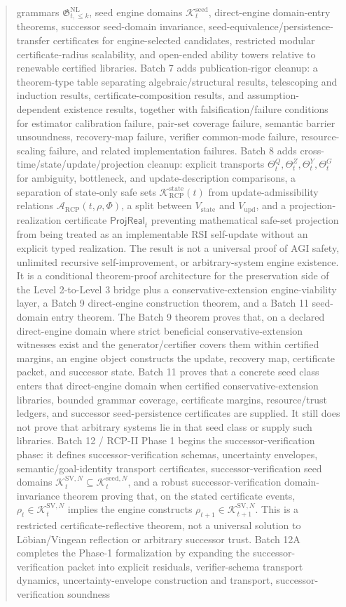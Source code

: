 \documentclass[11pt]{article}
\newcommand{\K}{\mathcal{K}}
\newcommand{\Acal}{\mathcal{A}}
\newcommand{\1}{\mathbf{1}}
\newcommand{\RCP}{\mathrm{RCP}}
\newcommand{\state}{\mathrm{state}}
\providecommand{\Kcal}{\mathcal{K}}
\providecommand{\upd}{\mathrm{upd}}
\begin{document}
\begin{abstract}
grammars \(\mathfrak G_{t,\le k}^{\mathrm{NL}}\), seed engine domains \(\Kcal_t^{\mathrm{seed}}\), direct-engine domain-entry theorems, successor seed-domain invariance, seed-equivalence/persistence-transfer certificates for engine-selected candidates, restricted modular certificate-radius scalability, and open-ended ability towers relative to renewable certified libraries. Batch 7 adds publication-rigor cleanup: a theorem-type table separating algebraic/structural results, telescoping and induction results, certificate-composition results, and assumption-dependent existence results, together with falsification/failure conditions for estimator calibration failure, pair-set coverage failure, semantic barrier unsoundness, recovery-map failure, verifier common-mode failure, resource-scaling failure, and related implementation failures. Batch 8 adds cross-time/state/update/projection cleanup: explicit transports \(\Theta_t^Q,\Theta_t^Z,\Theta_t^Y,\Theta_t^G\) for ambiguity, bottleneck, and update-description comparisons, a separation of state-only safe sets \(\K_{\RCP}^{\state}(t)\) from update-admissibility relations \(\Acal_{\RCP}(t,\rho,\Phi)\), a split between \(V_{\state}\) and \(V_{\upd}\), and a projection-realization certificate \(\mathsf{ProjReal}_t\) preventing mathematical safe-set projection from being treated as an implementable RSI self-update without an explicit typed realization. The result is not a universal proof of AGI safety, unlimited recursive self-improvement, or arbitrary-system engine existence. It is a conditional theorem-proof architecture for the preservation side of the Level 2-to-Level 3 bridge plus a conservative-extension engine-viability layer, a Batch 9 direct-engine construction theorem, and a Batch 11 seed-domain entry theorem. The Batch 9 theorem proves that, on a declared direct-engine domain where strict beneficial conservative-extension witnesses exist and the generator/certifier covers them within certified margins, an engine object constructs the update, recovery map, certificate packet, and successor state. Batch 11 proves that a concrete seed class enters that direct-engine domain when certified conservative-extension libraries, bounded grammar coverage, certificate margins, resource/trust ledgers, and successor seed-persistence certificates are supplied. It still does not prove that arbitrary systems lie in that seed class or supply such libraries. Batch 12 / RCP-II Phase 1 begins the successor-verification phase: it defines successor-verification schemas, uncertainty envelopes, semantic/goal-identity transport certificates, successor-verification seed domains \(\Kcal_t^{\mathrm{SV},N}\subseteq\Kcal_t^{\mathrm{seed},N}\), and a robust successor-verification domain-invariance theorem proving that, on the stated certificate events, \(\rho_t\in\Kcal_t^{\mathrm{SV},N}\) implies the engine constructs \(\rho_{t+1}\in\Kcal_{t+1}^{\mathrm{SV},N}\). This is a restricted certificate-reflective theorem, not a universal solution to L\"obian/Vingean reflection or arbitrary successor trust. Batch 12A completes the Phase-1 formalization by expanding the successor-verification packet into explicit residuals, verifier-schema transport dynamics, uncertainty-envelope construction and transport, successor-verification soundness 
\end{abstract}
\end{document}
